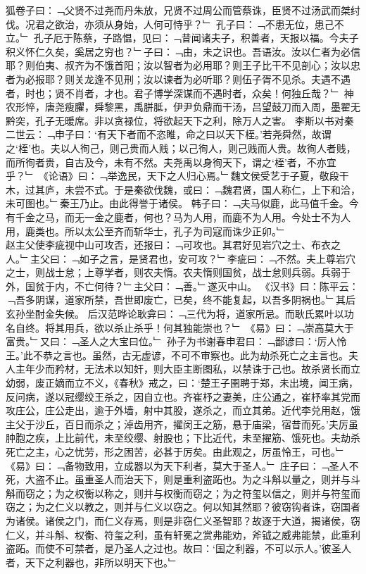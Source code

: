 狐卷子曰：﹁父贤不过尧而丹朱放，兄贤不过周公而管蔡诛，臣贤不过汤武而桀纣伐。况君之欲治，亦须从身始，人何可恃乎？﹂
孔子曰：﹁不患无位，患己不立。﹂
孔子厄于陈蔡，子路愠，见曰：﹁昔闻诸夫子，积善者，天报以福。今夫子积义怀仁久矣，奚居之穷也？﹂子曰：﹁由，未之识也。吾语汝。汝以仁者为必信耶？则伯夷、叔齐为不饿首阳；汝以智者为必用耶？则王子比干不见剖心；汝以忠者为必报耶？则关龙逢不见刑；汝以谏者为必听耶？则伍子胥不见杀。夫遇不遇者，时也；贤不肖者，才也。君子博学深谋而不遇时者，众矣！何独丘哉？﹂
神农形悴，唐尧瘦臞，舜黎黑，禹胼胝，伊尹负鼎而干汤，吕望鼓刀而入周，墨翟无黔突，孔子无暖席。非以贪禄位，将欲起天下之利，除万人之害。
李斯以书对秦二世云：﹁申子曰：‘有天下者而不恣睢，命之曰以天下桎。’若尧舜然，故谓之‘桎’也。夫以人徇己，则己贵而人贱；以己徇人，则己贱而人贵。故徇人者贱，而所徇者贵，自古及今，未有不然。夫尧禹以身徇天下，谓之‘桎’者，不亦宜乎？﹂
《论语》曰：﹁举逸民，天下之人归心焉。﹂魏文侯受艺于子夏，敬段干木，过其庐，未尝不式。于是秦欲伐魏，或曰：﹁魏君贤，国人称仁，上下和洽，未可图也。﹂秦王乃止。由此得誉于诸侯。
韩子曰：﹁夫马似鹿，此马值千金。今有千金之马，而无一金之鹿者，何也？马为人用，而鹿不为人用。今处士不为人用，鹿类也。所以太公至齐而斩华士，孔子为司寇而诛少正卯。﹂\\
赵主父使李疵视中山可攻否，还报曰：﹁可攻也。其君好见岩穴之士、布衣之人。﹂主父曰：﹁如子之言，是贤君也，安可攻？﹂李疵曰：﹁不然。夫上尊岩穴之士，则战士怠；上尊学者，则农夫惰。农夫惰则国贫，战士怠则兵弱。兵弱于外，国贫于内，不亡何待？﹂主父曰：﹁善。﹂遂灭中山。
《汉书》曰：陈平云：﹁吾多阴谋，道家所禁，吾世即废亡，已矣，终不能复起，以吾多阴祸也。﹂其后玄孙坐酎金失候。
后汉范晔论耿弇曰：﹁三代为将，道家所忌。而耿氏累叶以功名自终。将其用兵，欲以杀止杀乎！何其独能崇也？﹂
《易》曰：﹁崇高莫大于富贵。﹂又曰：﹁圣人之大宝曰位。﹂
孙子为书谢春申君曰：﹁鄙谚曰：‘厉人怜王。’此不恭之言也。虽然，古无虚谚，不可不审察也。此为劫杀死亡之主言也。夫人主年少而矜材，无法术以知奸，则大臣主断图私，以禁诛于己也。故杀贤长而立幼弱，废正嫡而立不义，《春秋》戒之，曰：‘楚王子圉聘于郑，未出境，闻王病，反问病，遂以冠缨绞王杀之，因自立也。齐崔杼之妻美，庄公通之，崔杼率其党而攻庄公，庄公走出，逾于外墙，射中其股，遂杀之，而立其弟。近代李兑用赵，饿主父于沙丘，百日而杀之；淖齿用齐，擢闵王之筋，悬于庙梁，宿昔而死。’夫厉虽肿胞之疾，上比前代，未至绞缨、射股也；下比近代，未至擢筋、饿死也。夫劫杀死亡之主，心之忧劳，形之困苦，必甚于厉矣。由此观之，厉虽怜王，可也。﹂
《易》曰：﹁备物致用，立成器以为天下利者，莫大于圣人。﹂
庄子曰：﹁圣人不死，大盗不止。虽重圣人而治天下，则是重利盗跖也。为之斗斛以量之，则并与斗斛而窃之；为之权衡以称之，则并与权衡而窃之；为之符玺以信之，则并与符玺而窃之；为之仁义以教之，则并与仁义以窃之。何以知其然耶？彼窃钩者诛，窃国者为诸侯。诸侯之门，而仁义存焉，则是非窃仁义圣智耶？故逐于大道，揭诸侯，窃仁义，并斗斛、权衡、符玺之利，虽有轩冕之赏弗能劝，斧钺之威弗能禁，此重利盗跖。而使不可禁者，是乃圣人之过也。故曰：‘国之利器，不可以示人。’彼圣人者，天下之利器也，非所以明天下也。﹂
